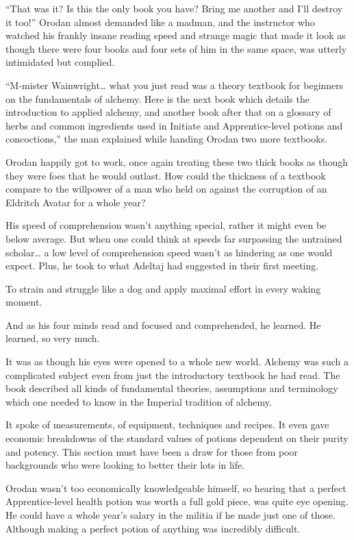 \documentclass[a4paper,10pt]{book}
\begin{document}
“That was it? Is this the only book you have? Bring me another and I’ll destroy it too!” Orodan almost demanded like a madman, and the instructor who watched his frankly insane reading speed and strange magic that made it look as though there were four books and four sets of him in the same space, was utterly intimidated but complied.\par
“M-mister Wainwright… what you just read was a theory textbook for beginners on the fundamentals of alchemy. Here is the next book which details the introduction to applied alchemy, and another book after that on a glossary of herbs and common ingredients used in Initiate and Apprentice-level potions and concoctions,” the man explained while handing Orodan two more textbooks.\par
Orodan happily got to work, once again treating these two thick books as though they were foes that he would outlast. How could the thickness of a textbook compare to the willpower of a man who held on against the corruption of an Eldritch Avatar for a whole year?\par
His speed of comprehension wasn’t anything special, rather it might even be below average. But when one could think at speeds far surpassing the untrained scholar… a low level of comprehension speed wasn’t as hindering as one would expect. Plus, he took to what Adeltaj had suggested in their first meeting.\par
To strain and struggle like a dog and apply maximal effort in every waking moment.\par
And as his four minds read and focused and comprehended, he learned. He learned, so very much.\par
It was as though his eyes were opened to a whole new world. Alchemy was such a complicated subject even from just the introductory textbook he had read. The book described all kinds of fundamental theories, assumptions and terminology which one needed to know in the Imperial tradition of alchemy.\par
It spoke of measurements, of equipment, techniques and recipes. It even gave economic breakdowns of the standard values of potions dependent on their purity and potency. This section must have been a draw for those from poor backgrounds who were looking to better their lots in life.\par
Orodan wasn’t too economically knowledgeable himself, so hearing that a perfect Apprentice-level health potion was worth a full gold piece, was quite eye opening. He could have a whole year’s salary in the militia if he made just one of those. Although making a perfect potion of anything was incredibly difficult.\par
\end{document}
